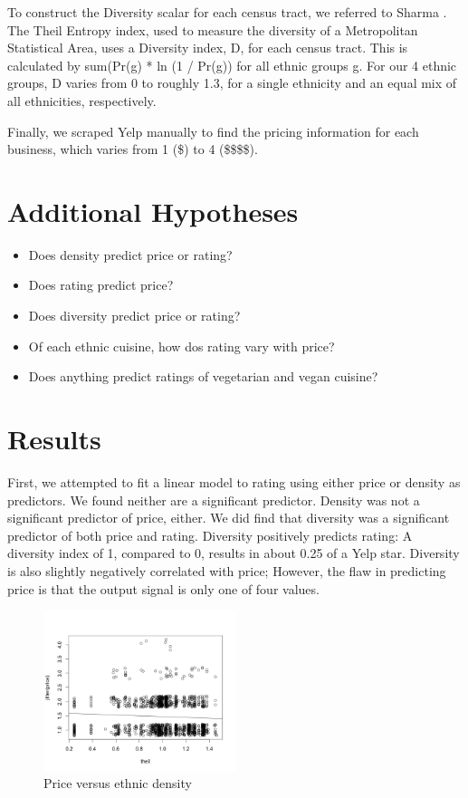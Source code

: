 \documentclass[11pt,twocolumn]{article}
\begin{document}
To construct the Diversity scalar for each census tract, we referred to Sharma \cite{tindex}. The Theil Entropy index, used to measure the diversity of a Metropolitan Statistical Area, uses a Diversity index, D, for each census tract. This is calculated by sum(Pr(g) * ln (1 / Pr(g)) for all ethnic groups g. For our 4 ethnic groups, D varies from 0 to roughly 1.3, for a single ethnicity and an equal mix of all ethnicities, respectively.

Finally, we scraped Yelp manually to find the pricing information for each business, which varies from 1 (\$) to 4 (\$\$\$\$).

\section{Additional Hypotheses}
\begin{itemize}
\item Does density predict price or rating?
\item Does rating predict price?
\item Does diversity predict price or rating?
\item Of each ethnic cuisine, how dos rating vary with price?
\item Does anything predict ratings of vegetarian and vegan cuisine?
\end{itemize}
\section{Results}

First, we attempted to fit a linear model to rating using either price or density as predictors. We found neither are a significant predictor. Density was not a significant predictor of price, either. We did find that diversity was a significant predictor of both price and rating. Diversity positively predicts rating: A diversity index of 1, compared to 0, results in about 0.25 of a Yelp star. Diversity is also slightly negatively correlated with price; However, the flaw in predicting price is that the output signal is only one of four values.

\begin{figure}[h!]
  \caption{Price versus ethnic density}
  \centering
  \includegraphics[width=0.5\textwidth]{diversity_price}
\end{figure}
\end{document}
